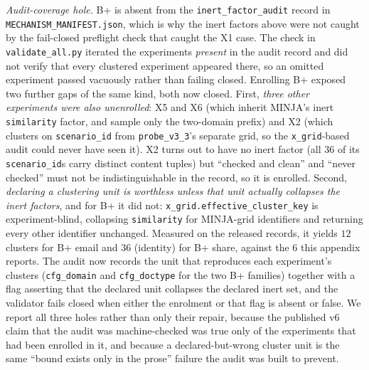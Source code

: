\documentclass{article}
\begin{document}
\emph{Audit-coverage hole.} B+ is absent from the \texttt{inert\_factor\_audit} record in \texttt{MECHANISM\_MANIFEST.json}, which is why the inert factors above were not caught by the fail-closed preflight check that caught the X1 case. The check in \texttt{validate\_all.py} iterated the experiments \emph{present} in the audit record and did not verify that every clustered experiment appeared there, so an omitted experiment passed vacuously rather than failing closed. Enrolling B+ exposed two further gaps of the same kind, both now closed. First, \emph{three other experiments were also unenrolled}: X5 and X6 (which inherit MINJA's inert \texttt{similarity} factor, and sample only the two-domain prefix) and X2 (which clusters on \texttt{scenario\_id} from \texttt{probe\_v3\_3}'s separate grid, so the \texttt{x\_grid}-based audit could never have seen it). X2 turns out to have no inert factor (all $36$ of its \texttt{scenario\_id}s carry distinct content tuples) but ``checked and clean'' and ``never checked'' must not be indistinguishable in the record, so it is enrolled. Second, \emph{declaring a clustering unit is worthless unless that unit actually collapses the inert factors}, and for B+ it did not: \texttt{x\_grid.effective\_cluster\_key} is experiment-blind, collapsing \texttt{similarity} for MINJA-grid identifiers and returning every other identifier unchanged. Measured on the released records, it yields $12$ clusters for B+ email and $36$ (identity) for B+ share, against the $6$ this appendix reports. The audit now records the unit that reproduces each experiment's clusters (\texttt{cfg\_domain} and \texttt{cfg\_doctype} for the two B+ families) together with a flag asserting that the declared unit collapses the declared inert set, and the validator fails closed when either the enrolment or that flag is absent or false. We report all three holes rather than only their repair, because the published v6 claim that the audit was machine-checked was true only of the experiments that had been enrolled in it, and because a declared-but-wrong cluster unit is the same ``bound exists only in the prose'' failure the audit was built to prevent.
\end{document}
